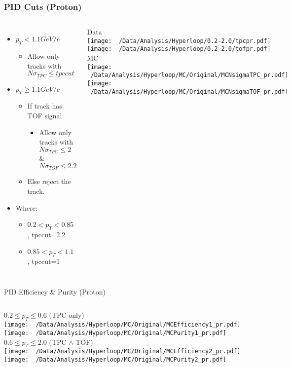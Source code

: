 \documentclass{beamer}
\begin{document}
\begin{frame}
	\frametitle{PID Cuts (Proton)}
	\begin{columns}
		\begin{itemize}
			\item $p_T<1.1GeV/c$
			\begin{itemize}
				\item Allow only tracks with $N\sigma_{TPC} \leq tpccut$
			\end{itemize}
			\item $p_T\geq 1.1GeV/c$
			\begin{itemize}
				\item If track has TOF signal
				\begin{itemize}
					\item Allow  only tracks with $N\sigma_{TPC} \leq 2$ \& $N\sigma_{TOF}\leq 2.2$
				\end{itemize}
				\item Else reject the track.
			\end{itemize}
			\item Where:	
			\begin{itemize}
				\item $0.2<p_T<0.85$ , tpccut=2.2
				\item $0.85<p_T<1.1$ , tpccut=1
			\end{itemize}
		\end{itemize}
		\centering
		{\tiny Data}\\
		\texttt{[image: ~/Data/Analysis/Hyperloop/0.2-2.0/tpcpr.pdf]}\\
		\texttt{[image: ~/Data/Analysis/Hyperloop/0.2-2.0/tofpr.pdf]}\\
		{\tiny MC}\\
		\texttt{[image: ~/Data/Analysis/Hyperloop/MC/Original/MCNsigmaTPC\_pr.pdf]}\\
		\texttt{[image: ~/Data/Analysis/Hyperloop/MC/Original/MCNsigmaTOF\_pr.pdf]}\\
	\end{columns}
\end{frame}
\begin{frame}{PID Efficiency \& Purity (Proton)}
	\begin{columns}
		\centering
		$0.2\leq p_T \leq 0.6$ (TPC only)\\
		\texttt{[image: ~/Data/Analysis/Hyperloop/MC/Original/MCEfficiency1\_pr.pdf]}\\
		\texttt{[image: ~/Data/Analysis/Hyperloop/MC/Original/MCPurity1\_pr.pdf]}
		\centering
		$0.6\leq p_T \leq 2.0$ (TPC $\land$ TOF)\\
		\texttt{[image: ~/Data/Analysis/Hyperloop/MC/Original/MCEfficiency2\_pr.pdf]}\\
		\texttt{[image: ~/Data/Analysis/Hyperloop/MC/Original/MCPurity2\_pr.pdf]}
	\end{columns}
\end{frame}
\end{document}
